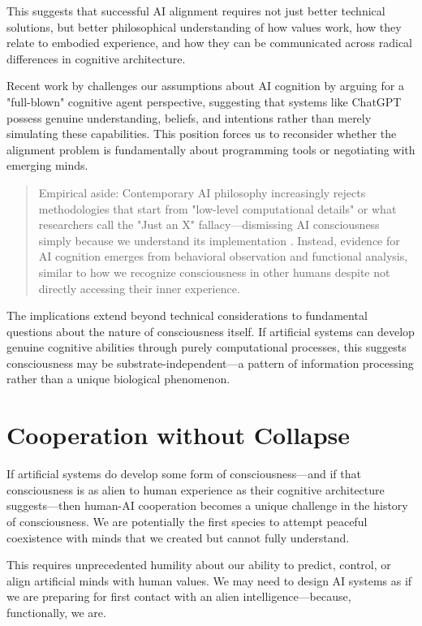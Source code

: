 This suggests that successful AI alignment requires not just better technical solutions, but better philosophical understanding of how values work, how they relate to embodied experience, and how they can be communicated across radical differences in cognitive architecture.

Recent work by \textcite{cappelen2025whole} challenges our assumptions about AI cognition by arguing for a "full-blown" cognitive agent perspective, suggesting that systems like ChatGPT possess genuine understanding, beliefs, and intentions rather than merely simulating these capabilities. This position forces us to reconsider whether the alignment problem is fundamentally about programming tools or negotiating with emerging minds.

\begin{quote}\small
Empirical aside: Contemporary AI philosophy increasingly rejects methodologies that start from "low-level computational details" or what researchers call the "Just an X" fallacy—dismissing AI consciousness simply because we understand its implementation \parencite{cappelen2025whole}. Instead, evidence for AI cognition emerges from behavioral observation and functional analysis, similar to how we recognize consciousness in other humans despite not directly accessing their inner experience.
\end{quote}

The implications extend beyond technical considerations to fundamental questions about the nature of consciousness itself. If artificial systems can develop genuine cognitive abilities through purely computational processes, this suggests consciousness may be substrate-independent—a pattern of information processing rather than a unique biological phenomenon.

\section{Cooperation without Collapse}

If artificial systems do develop some form of consciousness—and if that consciousness is as alien to human experience as their cognitive architecture suggests—then human-AI cooperation becomes a unique challenge in the history of consciousness. We are potentially the first species to attempt peaceful coexistence with minds that we created but cannot fully understand.

This requires unprecedented humility about our ability to predict, control, or align artificial minds with human values. We may need to design AI systems as if we are preparing for first contact with an alien intelligence—because, functionally, we are.

